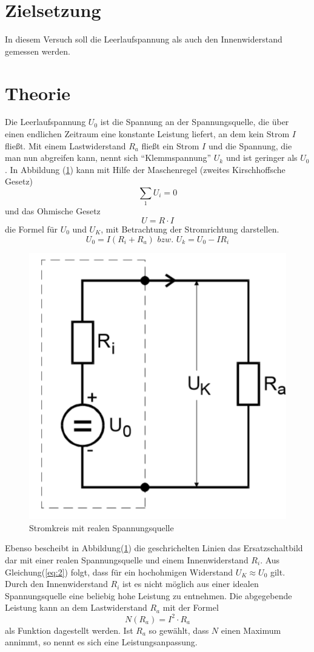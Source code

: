 \section{Zielsetzung}
In diesem Versuch soll die Leerlaufspannung als auch den Innenwiderstand gemessen werden.

\section{Theorie}
Die Leerlaufspannung $U_0$ ist die Spannung an der Spannungsquelle, die über einen endlichen Zeitraum eine konstante
Leistung liefert, an dem kein Strom $I$ fließt.
Mit einem Lastwiderstand $R_a$ fließt ein Strom $I$ und die Spannung, die man nun abgreifen kann,
nennt sich \enquote{Klemmspannung} $U_k$ und ist geringer als $U_0$.
In Abbildung (\ref{abb:1}) kann mit Hilfe der Maschenregel (zweites Kirschhoffsche Gesetz)
\begin{equation*}
  \sum_1 U_i = 0
\end{equation*}
und das Ohmische Gesetz
\begin{equation}
  U = R \cdot I
  \label{eq:1}
\end{equation}
die Formel für $U_0$ und $U_K$, mit Betrachtung der Stromrichtung darstellen.
\begin{equation}
  U_0= I (R_i + R_a) \,\, bzw. \,\, U_k=U_0 - I R_i
  \label{eq:2}
\end{equation}
\begin{figure}[H]
  \centering
  \includegraphics[width=10 cm, height= 7 cm]{Bild1.png}
  \caption{Stromkreis mit realen Spannungsquelle \cite{1}}
  \label{abb:1}
\end{figure}
Ebenso bescheibt in Abbildung(\ref{abb:1}) die geschrichelten Linien das Ersatzschaltbild dar
mit einer realen Spannungsquelle und einem Innenwiderstand $R_i$.
Aus Gleichung(\ref{eq:2}) folgt, dass für ein hochohmigen Widerstand $U_K \approx U_0$ gilt.\\
Durch den Innenwiderstand $R_i$  ist es nicht möglich aus einer idealen Spannungsquelle eine beliebig
hohe Leistung zu entnehmen. Die abgegebende Leistung kann an dem Lastwiderstand $R_a$ mit der Formel
\begin{equation}
  N(R_a) = I^2 \cdot R_a
  \label{eq:3}
\end{equation}
als Funktion dagestellt werden. Ist $R_a$ so gewählt, dass $N$ einen Maximum annimmt, so nennt es sich
eine Leistungsanpassung.
